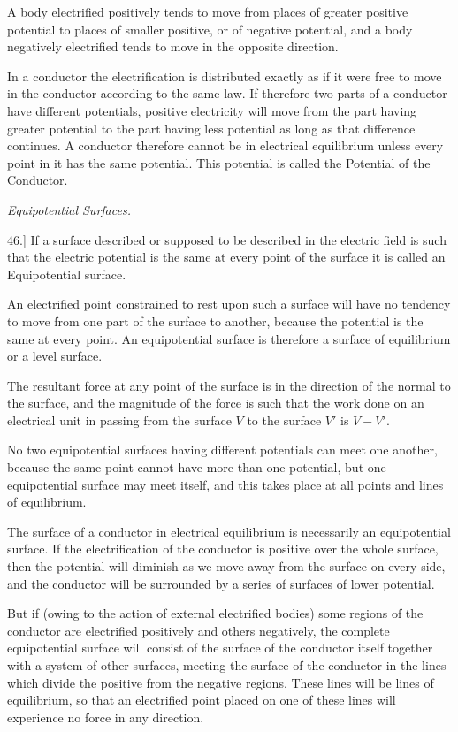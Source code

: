 \documentclass[11pt,a4paper]{article}
\begin{document}
A body electrified positively tends to move from places of greater
positive potential to places of smaller positive, or of negative
potential, and a body negatively electrified tends to move in the
opposite direction.

In a conductor the electrification is distributed exactly as if it were
free to move in the conductor according to the same law. If therefore
two parts of a conductor have different potentials, positive electricity
will move from the part having greater potential to the part having less
potential as long as that difference continues. A conductor therefore
cannot be in electrical equilibrium unless every point in it has the
same potential. This potential is called the Potential of the Conductor.

\begin{center}
\textit{Equipotential Surfaces.}
\end{center}

46.] If a surface described or supposed to be described in the electric
field is such that the electric potential is the same at every point of
the surface it is called an Equipotential surface.

An electrified point constrained to rest upon such a surface will have
no tendency to move from one part of the surface to another, because the
potential is the same at every point. An equipotential surface is
therefore a surface of equilibrium or a level surface.

\clearpage
\setcounter{footnote}{0}

The resultant force at any point of the surface is in the direction of
the normal to the surface, and the magnitude of the force is such that
the work done on an electrical unit in passing from the surface \(V\) to
the surface \(V'\) is \(V-V'\).

No two equipotential surfaces having different potentials can meet one
another, because the same point cannot have more than one potential, but
one equipotential surface may meet itself, and this takes place at all
points and lines of equilibrium.

The surface of a conductor in electrical equilibrium is necessarily an
equipotential surface. If the electrification of the conductor is
positive over the whole surface, then the potential will diminish as we
move away from the surface on every side, and the conductor will be
surrounded by a series of surfaces of lower potential.

But if (owing to the action of external electrified bodies) some regions
of the conductor are electrified positively and others negatively, the
complete equipotential surface will consist of the surface of the
conductor itself together with a system of other surfaces, meeting the
surface of the conductor in the lines which divide the positive from the
negative regions. These lines will be lines of equilibrium, so that an
electrified point placed on one of these lines will experience no force
in any direction.
\end{document}
